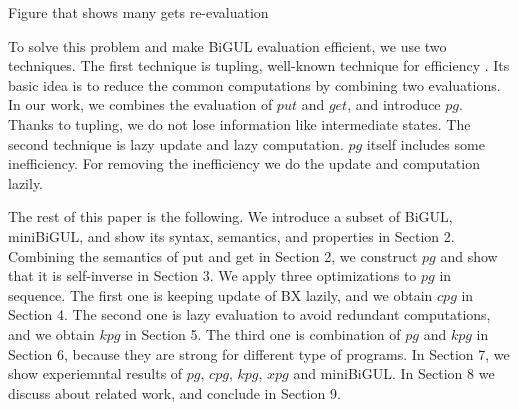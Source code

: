 \documentclass[runningheads]{llncs}
\begin{document}
Figure that shows many gets re-evaluation 

\vspace{5mm}

To solve this problem and make BiGUL evaluation efficient, we use two techniques. The first technique is tupling, well-known technique for efficiency \cite{}. Its basic idea is to reduce the common computations by combining two evaluations. In our work, we combines the evaluation of $put$ and $get$, and introduce $pg$. Thanks to tupling, we do not lose information like intermediate states.
The second technique is lazy update and lazy computation. $pg$ itself includes some inefficiency. For removing the inefficiency we do the update and computation lazily.

The rest of this paper is the following. We introduce a subset of BiGUL, miniBiGUL, and show its syntax, semantics, and properties in Section 2. Combining the semantics of put and get in Section 2, we construct $pg$ and show that it is self-inverse in Section 3.
We apply three optimizations to $pg$ in sequence. The first one is keeping update of BX lazily, and we obtain $cpg$ in Section 4. The second one is lazy evaluation to avoid redundant computations, and we obtain $kpg$ in Section 5. The third one is combination of $pg$ and $kpg$ in Section 6, because they are strong for different type of programs. In Section 7, we show experiemntal results of $pg$, $cpg$, $kpg$, $xpg$ and miniBiGUL.
In Section 8 we discuss about related work, and conclude in Section 9.




\end{document}
